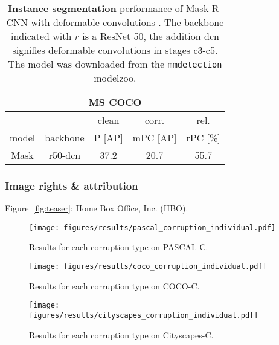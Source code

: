 \documentclass{article}
\begin{document}
\begin{table}[t!]
\begin{center}
\begin{tabular}{c|c|ccc}
\multicolumn{5}{c}{MS COCO} \\
\toprule
\multicolumn{2}{c}{} & clean & corr. & rel.\\
model & backbone & P \small{[AP]} & mPC \small{[AP]} & rPC \small{[\%]}\\
\hline
Mask & r50-dcn & 37.2 & 20.7 & 55.7\\
\bottomrule
\end{tabular}
\caption{\textbf{Instance segmentation} performance of Mask R-CNN with deformable convolutions \citep{dai2017deformable}. The backbone indicated with $r$ is a ResNet 50, the addition dcn signifies deformable convolutions in stages c3-c5. The model was downloaded from the \texttt{mmdetection} modelzoo.}
\label{table:results_corruption_benchmark_dcn_instance_segmentation}
\end{center}
\end{table}

\subsubsection*{Image rights \& attribution}
Figure~\ref{fig:teaser}: Home Box Office, Inc. (HBO).





\begin{figure*}[ht]
    \begin{center}
    \texttt{[image: figures/results/pascal\_corruption\_individual.pdf]}
    \end{center}
    \vspace{-0.2cm}
    \caption{Results for each corruption type on PASCAL-C.}
\label{fig:results_pascal_individual}
\end{figure*}

\begin{figure*}[t]
    \begin{center}
    \texttt{[image: figures/results/coco\_corruption\_individual.pdf]}
    \end{center}
    \vspace{-0.2cm}
    \caption{Results for each corruption type on COCO-C.}
\label{fig:results_Coco_individual}
\end{figure*}

\begin{figure*}[t]
    \begin{center}
    \texttt{[image: figures/results/cityscapes\_corruption\_individual.pdf]}
    \end{center}
    \vspace{-0.2cm}
    \caption{Results for each corruption type on Cityscapes-C.}
\label{fig:results_cityscapes_individual}
\end{figure*}
\end{document}
